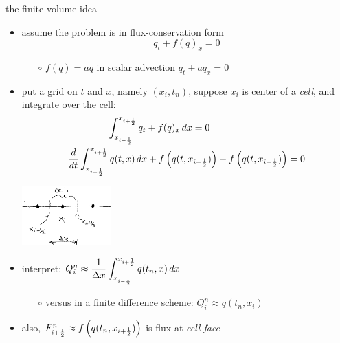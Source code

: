 \documentclass[10pt,hyperref]{beamer}
\newcommand{\ds}{\displaystyle}
\begin{document}
\begin{frame}{the finite volume idea}

\begin{itemize}
\item assume the problem is in flux-conservation form
    $$q_t + f(q)_x = 0$$

    \begin{itemize}
    \item[$\circ$] $f(q) = aq$ in scalar advection $q_t + a q_x = 0$
    \end{itemize}
\item put a grid on $t$ and $x$, namely $(x_i,t_n)$, suppose $x_i$ is center of a \emph{cell}, and integrate over the cell:
\begin{gather*}
\int_\ximhalf^\xiphalf q_t + f(q)_x \,dx = 0 \hspace{20mm}  \\
\frac{d}{dt} \int_\ximhalf^\xiphalf q(t,x) \,dx + f\left(q(t,\xiphalf)\right) - f\left(q(t,\ximhalf)\right) = 0
\end{gather*}

\vspace{-4mm}
\hfill \includegraphics[width=0.27\textwidth]{figs/fvsketch}

\vspace{-20mm}
\item interpret: $\ds Q_i^n \approx \frac{1}{\Delta x} \int_\ximhalf^\xiphalf q(t_n,x)\,dx$
    \begin{itemize}
    \item[$\circ$] versus in a finite difference scheme: $Q_i^n \approx q(t_n,x_i)$
    \end{itemize}
\item also, ${F^n_{i+\frac{1}{2}}} \approx f\left(q(t_n,{x_{i+\frac{1}{2}}})\right)$ is flux at \emph{cell face}
\end{itemize}
\end{frame}
\end{document}
